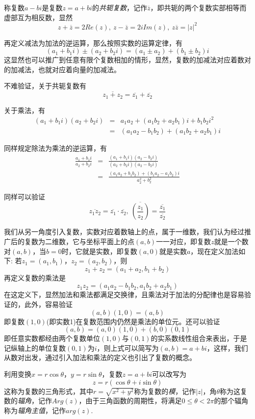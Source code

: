 称复数$a-bi$是复数$z=a+bi$的\emph{共轭复数}，记作$\overline{z}$，即共轭的两个复数实部相等而虚部互为相反数，显然
\[ z+\overline{z}=2Re(z), \  z-\overline{z}=2iIm(z), \  z\overline{z}=|z|^2 \]

再定义减法为加法的逆运算，那么按照实数的运算定律，有
\[ (a_1+b_1i) \pm (a_2+b_2i) = (a_1 \pm a_2) + (b_1 \pm b_2)i \]
这显然也可以推广到任意有限个复数相加的情形，显然，复数的加减法对应着数对的加减法，也就对应着向量的加减法。

不难验证，关于共轭复数有
\[ \overline{z_1+z_2}=\overline{z_1}+\overline{z_2} \]

关于乘法，有
\begin{eqnarray*}
  (a_1+b_1i)(a_2+b_2i) & = & a_1a_2+(a_1b_2+a_2b_1)i + b_1b_2 i^2 \\
  & = & (a_1a_2-b_1b_2) + (a_1b_2+a_2b_1)i
\end{eqnarray*}

同样规定除法为乘法的逆运算，有
\begin{eqnarray*}
  \frac{a_1+b_1i}{a_2+b_2i} & = & \frac{(a_1+b_1i)(a_2-b_2i)}{(a_2+b_2i)(a_2-b_2i)} \\
  & = & \frac{(a_1a_2+b_1b_2)+(b_1a_2-a_1b_2)i}{a_2^2+b_2^2}
\end{eqnarray*}

同样可以验证
\[ \overline{z_1z_2} = \overline{z_1} \cdot \overline{z_2}, \  \overline{\left( \frac{z_1}{z_2} \right)} = \frac{\overline{z_1}}{\overline{z_2}} \]

\begin{example}[从数对引入复数]
  我们从另一角度引入复数，实数对应着数轴上的点，属于一维数，我们认为经过推广后的复数为二维数，它与坐标平面上的点$(a,b)$一一对应，即复数$z$就是一个数对$(a,b)$，当$b=0$时，它就是实数，即复数$(a,0)$就是实数$a$，现在定义加法如下: 若$z_1=(a_1,b_1)$，$z_2=(a_2,b_2)$，则
  \[ z_1 + z_2 = (a_1 + a_2, b_1 + b_2) \]
  再定义复数的乘法是
  \[ z_1z_2 = (a_1a_2-b_1b_2,a_1b_2+a_2b_1) \]
  在这定义下，显然加法和乘法都满足交换律，且乘法对于加法的分配律也是容易验证的，此外，容易验证
  \[ (a,b)(1,0) = (a,b) \]
  即复数$(1,0)$(即实数1)在复数范围内仍然是乘法的单位元。还可以验证
  \[ (a,b) = (a,0)(1,0) + (b,0)(0,1)  \]
  即任意实数都经由两个复数单位$(1,0)$与$(0,1)$的实系数线性组合来表出，于是记纵轴上的单位复数$(0,1)$为$i$，则上式可以简写为$(a,b)=a+bi$，这样，我们从数对出发，通过引入加法和乘法的定义也引出了复数的概念。
\end{example}

利用变换$x=r\cos{\theta}$，$y=r\sin{\theta}$，复数$z=a+bi$可以改写为
\[ z=r(\cos{\theta}+i\sin{\theta}) \]
这称为复数的三角形式，其中$r=\sqrt{x^2+y^2}$称为复数的\emph{模}，记作$|z|$，角$\theta$称为这复数的\emph{辐角}，记作$Arg(z)$，由于三角函数的周期性，将满足$0\leqslant \theta < 2\pi$的那个辐角称为\emph{辐角主值}，记作$arg(z)$.

